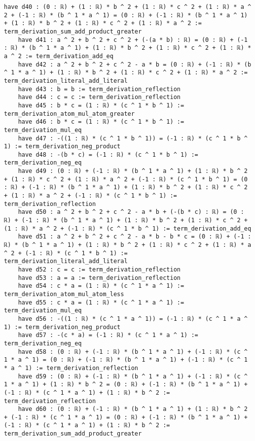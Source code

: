 \documentclass{article}
\begin{document}
\begin{tcolorbox}[colback=white!10, width=\linewidth]
\begin{lstlisting}[language=Lean4]
    have d40 : (0 : ℝ) + (1 : ℝ) * b ^ 2 + (1 : ℝ) * c ^ 2 + (1 : ℝ) * a ^ 2 + (-1 : ℝ) * (b ^ 1 * a ^ 1) = (0 : ℝ) + (-1 : ℝ) * (b ^ 1 * a ^ 1) + (1 : ℝ) * b ^ 2 + (1 : ℝ) * c ^ 2 + (1 : ℝ) * a ^ 2 := term_derivation_sum_add_product_greater
    have d41 : a ^ 2 + b ^ 2 + c ^ 2 + (-(a * b) : ℝ) = (0 : ℝ) + (-1 : ℝ) * (b ^ 1 * a ^ 1) + (1 : ℝ) * b ^ 2 + (1 : ℝ) * c ^ 2 + (1 : ℝ) * a ^ 2 := term_derivation_add_eq
    have d42 : a ^ 2 + b ^ 2 + c ^ 2 - a * b = (0 : ℝ) + (-1 : ℝ) * (b ^ 1 * a ^ 1) + (1 : ℝ) * b ^ 2 + (1 : ℝ) * c ^ 2 + (1 : ℝ) * a ^ 2 := term_derivation_literal_add_literal
    have d43 : b = b := term_derivation_reflection
    have d44 : c = c := term_derivation_reflection
    have d45 : b * c = (1 : ℝ) * (c ^ 1 * b ^ 1) := term_derivation_atom_mul_atom_greater
    have d46 : b * c = (1 : ℝ) * (c ^ 1 * b ^ 1) := term_derivation_mul_eq
    have d47 : -((1 : ℝ) * (c ^ 1 * b ^ 1)) = (-1 : ℝ) * (c ^ 1 * b ^ 1) := term_derivation_neg_product
    have d48 : -(b * c) = (-1 : ℝ) * (c ^ 1 * b ^ 1) := term_derivation_neg_eq
    have d49 : (0 : ℝ) + (-1 : ℝ) * (b ^ 1 * a ^ 1) + (1 : ℝ) * b ^ 2 + (1 : ℝ) * c ^ 2 + (1 : ℝ) * a ^ 2 + (-1 : ℝ) * (c ^ 1 * b ^ 1) = (0 : ℝ) + (-1 : ℝ) * (b ^ 1 * a ^ 1) + (1 : ℝ) * b ^ 2 + (1 : ℝ) * c ^ 2 + (1 : ℝ) * a ^ 2 + (-1 : ℝ) * (c ^ 1 * b ^ 1) := term_derivation_reflection
    have d50 : a ^ 2 + b ^ 2 + c ^ 2 - a * b + (-(b * c) : ℝ) = (0 : ℝ) + (-1 : ℝ) * (b ^ 1 * a ^ 1) + (1 : ℝ) * b ^ 2 + (1 : ℝ) * c ^ 2 + (1 : ℝ) * a ^ 2 + (-1 : ℝ) * (c ^ 1 * b ^ 1) := term_derivation_add_eq
    have d51 : a ^ 2 + b ^ 2 + c ^ 2 - a * b - b * c = (0 : ℝ) + (-1 : ℝ) * (b ^ 1 * a ^ 1) + (1 : ℝ) * b ^ 2 + (1 : ℝ) * c ^ 2 + (1 : ℝ) * a ^ 2 + (-1 : ℝ) * (c ^ 1 * b ^ 1) := term_derivation_literal_add_literal
    have d52 : c = c := term_derivation_reflection
    have d53 : a = a := term_derivation_reflection
    have d54 : c * a = (1 : ℝ) * (c ^ 1 * a ^ 1) := term_derivation_atom_mul_atom_less
    have d55 : c * a = (1 : ℝ) * (c ^ 1 * a ^ 1) := term_derivation_mul_eq
    have d56 : -((1 : ℝ) * (c ^ 1 * a ^ 1)) = (-1 : ℝ) * (c ^ 1 * a ^ 1) := term_derivation_neg_product
    have d57 : -(c * a) = (-1 : ℝ) * (c ^ 1 * a ^ 1) := term_derivation_neg_eq
    have d58 : (0 : ℝ) + (-1 : ℝ) * (b ^ 1 * a ^ 1) + (-1 : ℝ) * (c ^ 1 * a ^ 1) = (0 : ℝ) + (-1 : ℝ) * (b ^ 1 * a ^ 1) + (-1 : ℝ) * (c ^ 1 * a ^ 1) := term_derivation_reflection
    have d59 : (0 : ℝ) + (-1 : ℝ) * (b ^ 1 * a ^ 1) + (-1 : ℝ) * (c ^ 1 * a ^ 1) + (1 : ℝ) * b ^ 2 = (0 : ℝ) + (-1 : ℝ) * (b ^ 1 * a ^ 1) + (-1 : ℝ) * (c ^ 1 * a ^ 1) + (1 : ℝ) * b ^ 2 := term_derivation_reflection
    have d60 : (0 : ℝ) + (-1 : ℝ) * (b ^ 1 * a ^ 1) + (1 : ℝ) * b ^ 2 + (-1 : ℝ) * (c ^ 1 * a ^ 1) = (0 : ℝ) + (-1 : ℝ) * (b ^ 1 * a ^ 1) + (-1 : ℝ) * (c ^ 1 * a ^ 1) + (1 : ℝ) * b ^ 2 := term_derivation_sum_add_product_greater

\end{lstlisting}
\end{tcolorbox}
\end{document}
